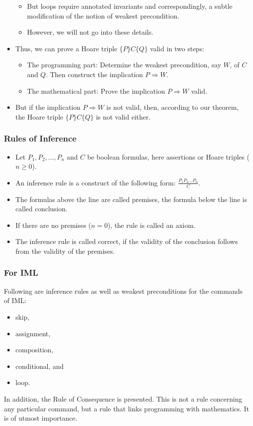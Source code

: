 \begin{multicols}{2}
\begin{itemize}
\begin{itemize}
    \item But loops require annotated invariants and correspondingly, a subtle modification of the notion of weakest precondition.
    \item However, we will not go into these details.
  \end{itemize}
  \item Thus, we can prove a Hoare triple $\{P\}C\{Q\}$ valid in two steps:
  \begin{itemize}
    \item The programming part: Determine the weakest precondition, say $W$, of $C$ and $Q$. Then construct the implication $P \Rightarrow W$.
    \item The mathematical part: Prove the implication $P \Rightarrow W$ valid.
  \end{itemize}
  \item But if the implication $P \Rightarrow W$ is not valid, then, according to our theorem, the Hoare triple $\{P\}C\{Q\}$ is not valid either.
\end{itemize}

\subsubsection{Rules of Inference}
\begin{itemize}
  \item Let $P_1,P_2,\ldots,P_n$ and $C$ be boolean formulas, here assertions or Hoare triples ($n\geq 0$).
  \item An inference rule is a construct of the following form: $\frac{P_1 P_2 \ldots P_n}{C}$.
  \item The formulas above the line are called premises, the formula below the line is called conclusion.
  \item If there are no premises ($n=0$), the rule is called an axiom.
  \item The inference rule is called correct, if the validity of the conclusion follows from the validity of the premises.
\end{itemize}

\subsubsection{For IML}
Following are inference rules as well as weakest preconditions for the commands of IML:
\begin{itemize}
  \item skip,
  \item assignment,
  \item composition,
  \item conditional, and
  \item loop.
\end{itemize}
In addition, the Rule of Consequence is presented.
This is not a rule concerning any particular command, but a rule that links programming with mathematics.
It is of utmost importance.


\end{multicols}
